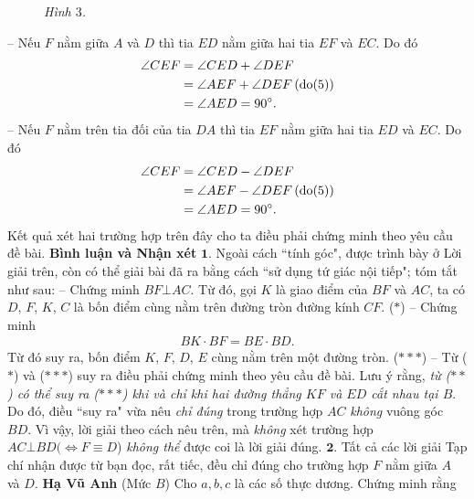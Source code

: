 \begin{multicols}{2}
\begin{figure}[H]
		\caption{\small\textit{\color{thachthuctoanhoc}Hình $3$.}}
		\vspace*{-10pt}
	\end{figure}
	-- Nếu $F$ nằm giữa $A$ và $D$ thì tia $ED$ nằm giữa hai tia $EF$ và $EC$. Do đó
	\begin{align*}
			\angle CEF &= \angle CED + \angle DEF\\
			 &= \angle AEF + \angle DEF\left( {{\rm{do}}(5)} \right)\\
			 &= \angle AED = {90^{\circ}}.
	\end{align*}
	-- Nếu $F$ nằm trên tia đối của tia $DA$ thì tia $EF$ nằm giữa hai tia $ED$ và $EC$. Do đó
	\begin{align*}
			\angle CEF &= \angle CED - \angle DEF\\
			 &= \angle AEF - \angle DEF\left( {{\rm{do}}(5)} \right)\\
			 &= \angle AED = {90^{\circ}}.
	\end{align*}
	Kết quả xét hai trường hợp trên đây cho ta điều phải chứng minh theo yêu cầu đề bài.
	\vskip 0.05cm
	\textbf{\color{thachthuctoanhoc}Bình luận và Nhận xét}
	\vskip 0.05cm
	$\pmb{1.}$ Ngoài cách ``tính góc", được trình bày ở Lời giải trên, còn có thể giải bài đã ra bằng cách ``sử dụng tứ giác nội tiếp"; tóm tắt như sau:
	\vskip 0.05cm
	-- Chứng minh $BF \bot  AC$. Từ đó, gọi $K$ là giao điểm của $BF$ và $AC$, ta có $D$, $F$, $K$, $C$ là bốn điểm cùng nằm trên đường tròn đường kính $CF$. \hfill ($*$)
	\vskip 0.05cm
	-- Chứng minh
	\begin{align*}
		BK \cdot BF = BE \cdot BD. \tag{$**$}
	\end{align*}
	Từ đó suy ra, bốn điểm $K$, $F$, $D$, $E$ cùng nằm trên một đường tròn.                                                  \hfill ($***$)
	\vskip 0.05cm
	-- Từ ($*$) và ($***$) suy ra điều phải chứng minh theo yêu cầu đề bài.
	\vskip 0.05cm
	Lưu ý rằng, \textit{từ ($**$) có thể suy ra ($***$) khi và chỉ khi hai đường thẳng $KF$ và $ED$ cắt nhau tại $B$}. Do đó, điều ``suy ra" vừa nêu \textit{chỉ đúng} trong trường hợp $AC$ \textit{không} vuông góc $BD$. Vì vậy, lời giải theo cách nêu trên, mà \textit{không} xét trường hợp $AC \bot  BD (\Leftrightarrow F \equiv D$) \textit{không thể} được coi là lời giải đúng.
	\vskip 0.05cm
	$\pmb{2.}$ Tất cả các lời giải Tạp chí nhận được từ bạn đọc, rất tiếc, đều chỉ đúng cho trường hợp $F$ nằm giữa $A$ và $D$.
	\vskip 0.05cm
	\hfill\textbf{\color{thachthuctoanhoc}Hạ Vũ Anh}
	\vskip 0.05cm
	{}
	(Mức $B$) Cho $a, b, c$ là các số thực dương. Chứng minh rằng

\end{multicols}
